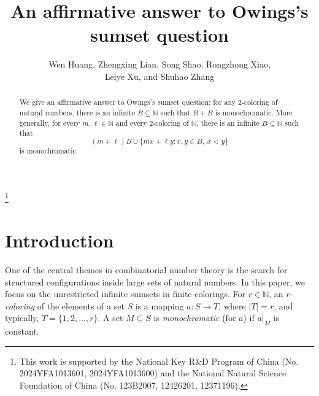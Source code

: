 \documentclass[reqno,12pt]{amsart}
\def \N {\mathbb N}
\numberwithin{equation}{section}
\begin{document}
	
	
\title[]{An affirmative answer to Owings's sumset question}

	\author[]{Wen Huang, Zhengxing Lian, Song Shao, Rongzhong Xiao,\\ Leiye Xu, and Shuhao Zhang}	
	\address[Wen Huang, Song Shao, Rongzhong Xiao, Leiye Xu, and Shuhao Zhang]{School of Mathematical Sciences, University of Science and Technology of China, Hefei, Anhui, 230026, PR China}

   \address[Zhengxing Lian]{School of Mathematical Sciences, Xiamen University, Xiamen, Fujian, 361005, PR China}
%	
%	
	\thanks{This work is supported by the National Key R\&D Program of China (No. 2024YFA1013601, 2024YFA1013600) and the National Natural Science Foundation of China (No. 123B2007, 12426201, 12371196).
}
	
\begin{abstract}
We give an affirmative answer to Owings's sumset question: for any $2$-coloring of natural numbers, there is an infinite $B\subseteq\N$ such that $B+B$ is monochromatic. More generally, for every $m,\ell\in\N$ and every $2$-coloring of $\N$, there is an infinite $B\subseteq\N$ such that
$$
(m+\ell)B\cup\{mx+\ell y:x,y\in B,\ x<y\}
$$
is monochromatic. %

\end{abstract}

\maketitle

\section{Introduction}
One of the central themes in combinatorial number theory is the search for
structured configurations inside large sets of natural numbers.
In this paper, we focus on the unrestricted infinite sumsets in finite colorings. For $r\in \N$,  an {\em $r$-coloring} of the elements of a set $S$ is a mapping $a: S\rightarrow T$, where $|T|=r$, and typically, $T=\{1,2,\ldots, r\}$.
A set $M\subseteq S$ is {\em monochromatic} (for $a$) if $a|_M$ is constant.
\end{document}
